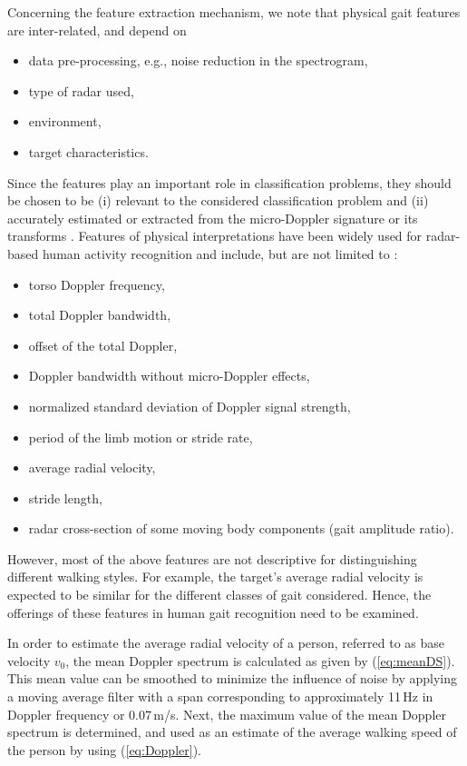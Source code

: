 Concerning the feature extraction mechanism, we note that physical gait features are inter-related, and depend on \cite{Bjoe15,Gur15}
\begin{itemize}
	\item data pre-processing, e.g., noise reduction in the spectrogram,%
	\item type of radar used,%
	\item environment,%
	\item target characteristics.%
\end{itemize}
Since the features play an important role in classification problems, they should be chosen to be (i) relevant to the considered classification problem and (ii) accurately estimated or extracted from the micro-Doppler signature or its transforms \cite{Gur15}. Features of physical interpretations have been widely used for radar-based human activity recognition and include, but are not limited to \cite{Kim09,Ote05}: 
\begin{itemize}
	\item torso Doppler frequency,%
	\item total Doppler bandwidth,%
	\item offset of the total Doppler,%
	\item Doppler bandwidth without micro-Doppler effects,%
	\item normalized standard deviation of Doppler signal strength,%
	\item period of the limb motion or stride rate,%
	\item average radial velocity,%
	\item stride length,%
	\item radar cross-section of some moving body components (gait amplitude ratio).%
\end{itemize}
However, most of the above features are not descriptive for distinguishing different walking styles. For example, the target's average radial velocity is expected to be similar for the different classes of gait considered. Hence, the offerings of these features in human gait recognition need to be examined.

In order to estimate the average radial velocity of a person, referred to as base velocity $v_0$, the mean Doppler spectrum is calculated as given by (\ref{eq:meanDS}). This mean value can be smoothed to minimize the influence of noise by applying a moving average filter with a span corresponding to approximately 11\,Hz in Doppler frequency or 0.07\,m/s. Next, the maximum value of the mean Doppler spectrum is determined, and used as an estimate of the average walking speed of the person by using (\ref{eq:Doppler}).


